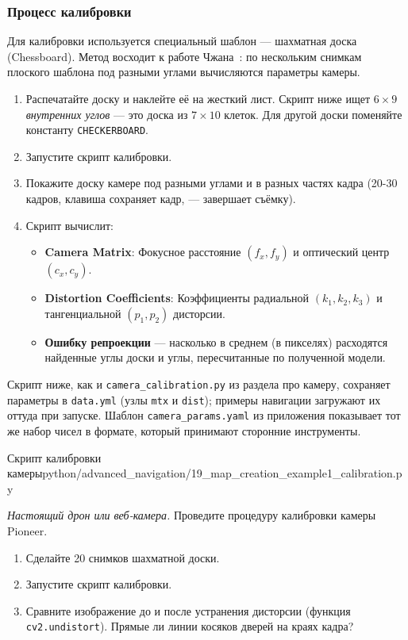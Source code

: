 \subsubsection{Процесс калибровки}
Для калибровки используется специальный шаблон — шахматная доска (Chessboard). Метод восходит к работе Чжана~\cite{zhang2000calibration}: по нескольким снимкам плоского шаблона под разными углами вычисляются параметры камеры.
\begin{enumerate}
    \item Распечатайте доску и наклейте её на жесткий лист. Скрипт ниже ищет $6 \times 9$ \emph{внутренних углов} --- это доска из $7 \times 10$ клеток. Для другой доски поменяйте константу \verb|CHECKERBOARD|.
    \item Запустите скрипт калибровки.
    \item Покажите доску камере под разными углами и в разных частях кадра (20-30 кадров, клавиша  сохраняет кадр,  --- завершает съёмку).
    \item Скрипт вычислит:
    \begin{itemize}
        \item \textbf{Camera Matrix}: Фокусное расстояние $(f_x, f_y)$ и оптический центр $(c_x, c_y)$.
        \item \textbf{Distortion Coefficients}: Коэффициенты радиальной $(k_1, k_2, k_3)$ и тангенциальной $(p_1, p_2)$ дисторсии.
        \item \textbf{Ошибку репроекции} --- насколько в среднем (в пикселях) расходятся найденные углы доски и углы, пересчитанные по полученной модели.
    \end{itemize}
\end{enumerate}

Скрипт ниже, как и \texttt{camera\_calibration.py} из раздела про камеру, сохраняет параметры в \texttt{data.yml} (узлы \texttt{mtx} и \texttt{dist}); примеры навигации загружают их оттуда при запуске. Шаблон \texttt{camera\_params.yaml} из приложения показывает тот же набор чисел в формате, который принимают сторонние инструменты.

\begin{codefiletitle}[python]{Скрипт калибровки камеры}{python/advanced_navigation/19_map_creation_example1_calibration.py}
\end{codefiletitle}

\begin{taskbox}[Калибровка]
\emph{Настоящий дрон или веб-камера.} Проведите процедуру калибровки камеры Pioneer.
\begin{enumerate}
    \item Сделайте 20 снимков шахматной доски.
    \item Запустите скрипт калибровки.
    \item Сравните изображение до и после устранения дисторсии (функция \texttt{cv2.undistort}). Прямые ли линии косяков дверей на краях кадра?
\end{enumerate}
\end{taskbox}


